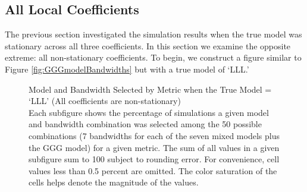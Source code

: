 \documentclass{article}\usepackage[]{graphicx}\usepackage[]{color}
\begin{document}
\subsection{All Local Coefficients}

The previous section investigated the simulation results when the true model was stationary across all three coefficients. In this section we examine the opposite extreme: all non-stationary coefficients. To begin, we construct a figure similar to Figure \ref{fig:GGGmodelBandwidths} but with a true model of `LLL.'   



\begin{figure}
\caption{Model and Bandwidth Selected by Metric when the True Model = `LLL' (All coefficients are non-stationary) \\ Each subfigure shows the percentage of simulations a given model and bandwidth combination was selected among the 50 possible combinations (7 bandwidths for each of the seven mixed models plus the GGG model) for a given metric. The sum of all values in a given subfigure sum to 100 subject to rounding error. For convenience, cell values less than 0.5 percent are omitted. The color saturation of the cells helps denote the magnitude of the values.}
\label{fig:LLLmodelBandwidths}
\end{figure}
\end{document}
